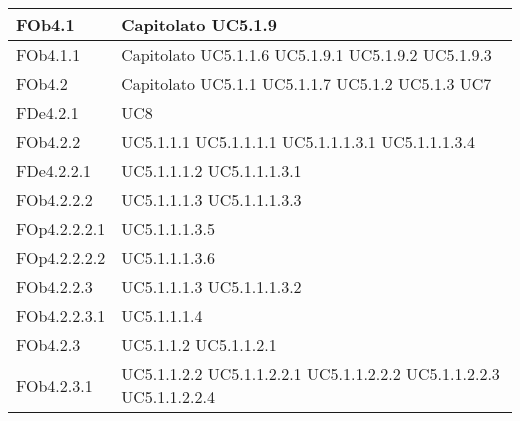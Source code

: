 \begin{longtable}{|l|p{4cm}|}
\hline
FOb4.1 & Capitolato \linebreak  UC5.1.9 \linebreak  \\ 
\hline
FOb4.1.1 & Capitolato \linebreak  UC5.1.1.6 \linebreak  UC5.1.9.1 \linebreak  UC5.1.9.2 \linebreak  UC5.1.9.3 \linebreak  \\ 
\hline
FOb4.2 & Capitolato \linebreak  UC5.1.1 \linebreak  UC5.1.1.7 \linebreak  UC5.1.2 \linebreak  UC5.1.3 \linebreak  UC7 \linebreak  \\ 
\hline
FDe4.2.1 & UC8 \linebreak  \\ 
\hline
FOb4.2.2 & UC5.1.1.1 \linebreak  UC5.1.1.1.1 \linebreak  UC5.1.1.1.3.1 \linebreak  UC5.1.1.1.3.4 \linebreak  \\ 
\hline
FDe4.2.2.1 & UC5.1.1.1.2 \linebreak  UC5.1.1.1.3.1 \linebreak  \\ 
\hline
FOb4.2.2.2 & UC5.1.1.1.3 \linebreak  UC5.1.1.1.3.3 \linebreak  \\ 
\hline
FOp4.2.2.2.1 & UC5.1.1.1.3.5 \linebreak  \\ 
\hline
FOp4.2.2.2.2 & UC5.1.1.1.3.6 \linebreak  \\ 
\hline
FOb4.2.2.3 & UC5.1.1.1.3 \linebreak  UC5.1.1.1.3.2 \linebreak  \\ 
\hline
FOb4.2.2.3.1 & UC5.1.1.1.4 \linebreak  \\ 
\hline
FOb4.2.3 & UC5.1.1.2 \linebreak  UC5.1.1.2.1 \linebreak  \\ 
\hline
FOb4.2.3.1 & UC5.1.1.2.2 \linebreak  UC5.1.1.2.2.1 \linebreak  UC5.1.1.2.2.2 \linebreak  UC5.1.1.2.2.3 \linebreak  UC5.1.1.2.2.4 \linebreak  \\ 

\end{longtable}
